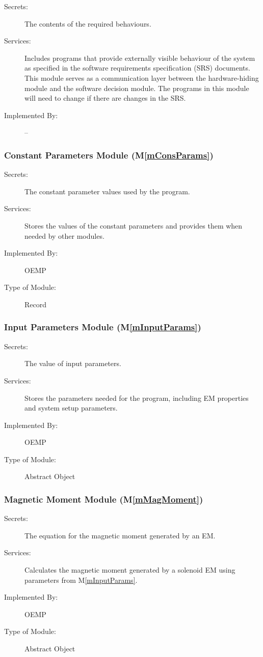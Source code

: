 \documentclass[12pt, titlepage]{article}
\newcommand{\mref}[1]{M\ref{#1}}
\begin{document}
\begin{description}
\item[Secrets:]The contents of the required behaviours.
\item[Services:]Includes programs that provide externally visible behaviour of
  the system as specified in the software requirements specification (SRS)
  documents. This module serves as a communication layer between the
  hardware-hiding module and the software decision module. The programs in this
  module will need to change if there are changes in the SRS.
\item[Implemented By:] --
\end{description}

\subsubsection{Constant Parameters Module (\mref{mConsParams})}
\begin{description}
  \item[Secrets:]The constant parameter values used by the program.
  \item[Services:]Stores the values of the constant parameters and provides them when needed by other modules.
  \item[Implemented By:] OEMP
  \item[Type of Module:] Record
\end{description}

\subsubsection{Input Parameters Module (\mref{mInputParams})}
\begin{description}
  \item[Secrets:]The value of input parameters.
  \item[Services:]Stores the parameters needed for the program, including EM properties and system setup parameters. 
  \item[Implemented By:] OEMP
  \item[Type of Module:] Abstract Object
\end{description}

\subsubsection{Magnetic Moment Module (\mref{mMagMoment})}
\begin{description}
  \item[Secrets:]The equation for the magnetic moment generated by an EM.
  \item[Services:]Calculates the magnetic moment generated by a solenoid EM using parameters from \mref{mInputParams}. 
  \item[Implemented By:] OEMP
  \item[Type of Module:] Abstract Object
\end{description}
\end{document}
